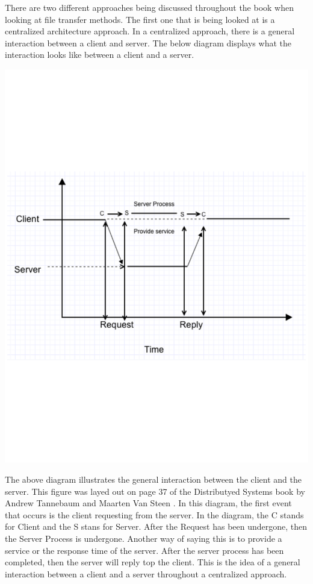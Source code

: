 \documentclass{article}
\begin{document}
There are two different approaches being discussed throughout the book when looking at file transfer methods. The first one that is being looked at is a centralized architecture approach. In a centralized approach, there is a general interaction between a client and server. The below diagram displays what the interaction looks like between a client and a server.
\begin{center}
\vspace{-10em}
\includegraphics[scale=0.5]{Centralized.pdf}
\vspace{-10em}
\end{center}
The above diagram illustrates the general interaction between the client and the server. This figure was layed out on page 37 of the Distributyed Systems book by Andrew Tannebaum and Maarten Van Steen \cite{tanenbaum_steen_2007}. In this diagram, the first event that occurs is the client requesting from the server. In the diagram, the C stands for Client and the S stans for Server. After the Request has been undergone, then the Server Process is undergone. Another way of saying this is to provide a service or the response time of the server. After the server process has been completed, then the server will reply top the client. This is the idea of a general interaction between a client and a server throughout a centralized approach.
\end{document}
